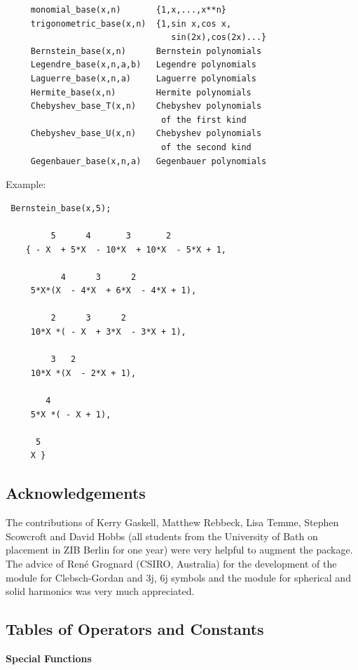 \begin{verbatim}
     monomial_base(x,n)       {1,x,...,x**n}
     trigonometric_base(x,n)  {1,sin x,cos x,
                                 sin(2x),cos(2x)...}
     Bernstein_base(x,n)      Bernstein polynomials
     Legendre_base(x,n,a,b)   Legendre polynomials
     Laguerre_base(x,n,a)     Laguerre polynomials
     Hermite_base(x,n)        Hermite polynomials
     Chebyshev_base_T(x,n)    Chebyshev polynomials
                               of the first kind
     Chebyshev_base_U(x,n)    Chebyshev polynomials
                               of the second kind
     Gegenbauer_base(x,n,a)   Gegenbauer polynomials
\end{verbatim}

Example:
\begin{verbatim}
 Bernstein_base(x,5);

         5      4       3       2
    { - X  + 5*X  - 10*X  + 10*X  - 5*X + 1,

           4      3      2
     5*X*(X  - 4*X  + 6*X  - 4*X + 1),

         2      3      2
     10*X *( - X  + 3*X  - 3*X + 1),

         3   2
     10*X *(X  - 2*X + 1),

        4
     5*X *( - X + 1),

      5
     X }

\end{verbatim}

\subsection{Acknowledgements}

The contributions of Kerry Gaskell, Matthew Rebbeck, Lisa Temme,
Stephen Scowcroft and David Hobbs (all students from the University of Bath
on placement in ZIB Berlin for one year) were very helpful
to augment the package. The advice of Ren\'e Grognard (CSIRO, Australia)
for the development of the module for Clebsch-Gordan and 3j, 6j symbols
and the module for spherical and solid harmonics was very much appreciated.

\subsection{Tables of Operators and Constants}
\hypertarget{SPECFNTAB1}{}

\textbf{Special Functions}

